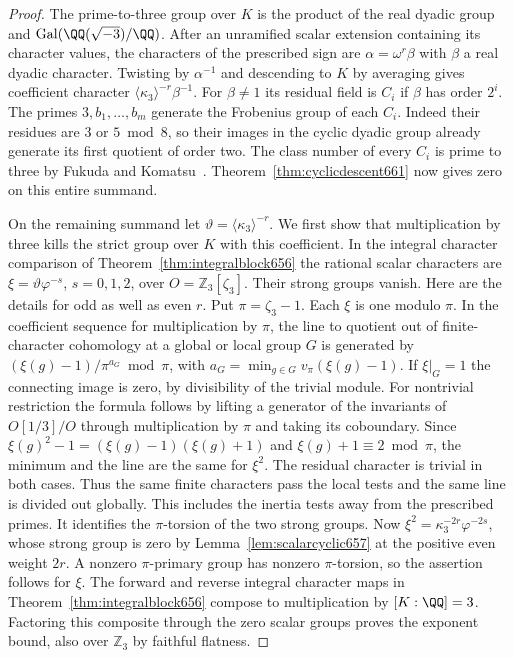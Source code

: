 \documentclass[a4paper,11pt]{article}
\theoremstyle{definition}
\theoremstyle{remark}
\newcommand{\ZZ}{\mathbb Z}\newcommand{\ord}{\operatorname{ord}}
\numberwithin{equation}{section}
\begin{document}
\begin{proof}
The prime-to-three group over \(K\) is the product of the real
dyadic group and \(\operatorname{Gal}(\QQ(\sqrt{-3})/\QQ)\).
After an unramified scalar extension containing its character
values, the characters of the prescribed sign are
\(\alpha=\omega^r\beta\) with \(\beta\) a real dyadic character.
Twisting by \(\alpha^{-1}\) and descending to \(K\) by averaging
gives coefficient character
\(\langle\kappa_3\rangle^{-r}\beta^{-1}\).
For \(\beta\ne1\) its residual field is \(C_i\) if \(\beta\)
has order \(2^i\). The primes \(3,b_1,\ldots,b_m\) generate the
Frobenius group of each \(C_i\). Indeed their residues are
\(3\) or \(5\bmod8\), so their images in the cyclic dyadic
group already generate its first quotient of order two.
The class number of every \(C_i\) is prime to three by
Fukuda and Komatsu~\cite[Corollary~1.1]{V-III-weberFK524}.
Theorem~\ref{thm:cyclicdescent661} now gives zero on this
entire summand.

On the remaining summand let
\(\vartheta=\langle\kappa_3\rangle^{-r}\). We first show that
multiplication by three kills the strict group over \(K\)
with this coefficient. In the integral character comparison of
Theorem~\ref{thm:integralblock656} the rational scalar characters
are \(\xi=\vartheta\varphi^{-s}\), \(s=0,1,2\), over
\(O=\ZZ_3[\zeta_3]\). Their strong groups vanish. Here are the
details for odd as well as even \(r\). Put \(\pi=\zeta_3-1\).
Each \(\xi\) is one modulo \(\pi\). In the coefficient sequence
for multiplication by \(\pi\), the line to quotient out of
finite-character cohomology at a global or local group \(G\)
is generated by \((\xi(g)-1)/\pi^{a_G}\bmod\pi\), with
\(a_G=\min_{g\in G}v_\pi(\xi(g)-1)\). If \(\xi|_G=1\) the
connecting image is zero, by divisibility of the trivial module.
For nontrivial restriction the formula follows by lifting
a generator of the invariants of \(O[1/3]/O\) through
multiplication by \(\pi\) and taking its coboundary.
Since \(\xi(g)^2-1=(\xi(g)-1)(\xi(g)+1)\) and
\(\xi(g)+1\equiv2\bmod\pi\), the minimum and the line are the
same for \(\xi^2\). The residual character is trivial in both
cases. Thus the same finite characters pass the local tests
and the same line is divided out globally. This includes the
inertia tests away from the prescribed primes. It identifies the
\(\pi\)-torsion of the two strong groups. Now
\(\xi^2=\kappa_3^{-2r}\varphi^{-2s}\), whose strong group is
zero by Lemma~\ref{lem:scalarcyclic657} at the positive even weight
\(2r\). A nonzero \(\pi\)-primary group has nonzero \(\pi\)-torsion,
so the assertion follows for \(\xi\). The forward and reverse
integral character maps in Theorem~\ref{thm:integralblock656}
compose to multiplication by \([K:\QQ]=3\). Factoring this
composite through the zero scalar groups proves the exponent
bound, also over \(\ZZ_3\) by faithful flatness.


\end{proof}
\end{document}
